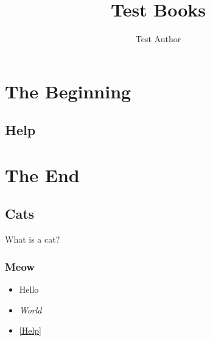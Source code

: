 \documentclass[12pt, openany]{book}
\begin{document}
\title{Test Books}
\author{Test Author}
\date{ }
\maketitle
\tableofcontents
\part{The Beginning}
\chapter{Help}
\label{Help}
\part{The End}
\chapter{Cats}
What is a cat?
\section{Meow}
\begin{itemize}
\item{Hello}
\item{\textit{World}}
\item{\autoref{Help}}
\end{itemize}
\end{document}

